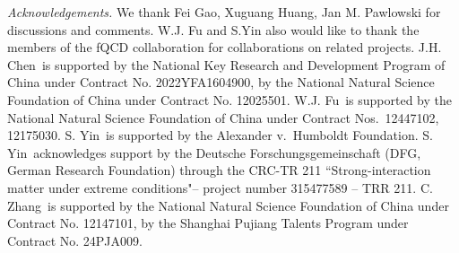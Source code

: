 \documentclass[aps,twocolumn,prd,superscriptaddress,nofootinbib,floatfix]{revtex4-2} %
\begin{document}
\textit{Acknowledgements.} We thank Fei Gao,  Xuguang Huang, Jan M. Pawlowski for discussions and comments. W.J. Fu and S.Yin also would like to thank the members of the fQCD collaboration \cite{fQCD} for collaborations on related projects.
J.H. Chen\ is supported by the National Key Research and Development Program of China under Contract No. 2022YFA1604900, by the National Natural Science Foundation of China under Contract No. 12025501.
W.J. Fu\ is supported by the National Natural Science Foundation of China under Contract Nos.\ 12447102, 12175030. 
S. Yin\ is supported by the Alexander v.\ Humboldt Foundation. 
S. Yin\ acknowledges support by the Deutsche Forschungsgemeinschaft (DFG, German Research Foundation) through the CRC-TR 211 ``Strong-interaction matter under extreme conditions"– project number 315477589 – TRR 211.
C. Zhang\ is supported by the National Natural Science Foundation of China under Contract No. 12147101, by the Shanghai Pujiang Talents Program under Contract No. 24PJA009.

% 

\vfill 


\end{document}
